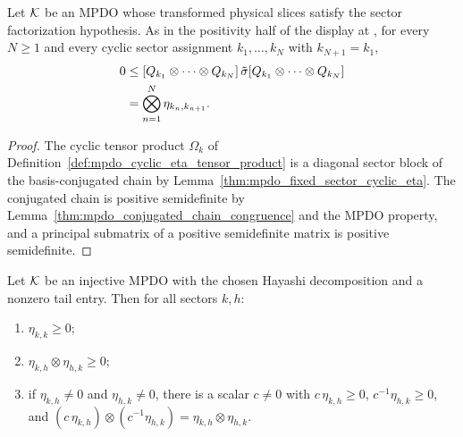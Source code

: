 \begin{lemma}%
    \label{thm:mpdo_cyclic_eta_posSemidef}
    \leanok
    Let ${\cal K}$ be an MPDO whose transformed physical slices satisfy the
    sector factorization hypothesis. As in the positivity half of the display at
    \cite[Appendix~C.2, lines~1446--1450]{Cirac2016MPDO_arXiv}, for every
    $N\ge1$ and every cyclic sector assignment $k_1,\ldots,k_N$ with
    $k_{N+1}=k_1$,
    \begin{align}
        0
         & \leq
        [Q_{k_1}\otimes\cdots\otimes Q_{k_N}]\,\tilde\sigma
        [Q_{k_1}\otimes\cdots\otimes Q_{k_N}]
        \notag                                      \\
         & =\bigotimes_{n=1}^{N}\eta_{k_n,k_{n+1}}.
        \notag
    \end{align}
\end{lemma}

\begin{proof}
    \leanok
    The cyclic tensor product $\Omega_k$ of
    Definition~\ref{def:mpdo_cyclic_eta_tensor_product} is a diagonal
    sector block of the basis-conjugated chain by
    Lemma~\ref{thm:mpdo_fixed_sector_cyclic_eta}. The conjugated chain is
    positive semidefinite by
    Lemma~\ref{thm:mpdo_conjugated_chain_congruence} and the MPDO
    property, and a principal submatrix of a positive semidefinite matrix
    is positive semidefinite.
\end{proof}

\begin{lemma}%
    \label{thm:mpdo_sector_eta_pair_posSemidef}
    \leanok
    Let ${\cal K}$ be an injective MPDO with the chosen Hayashi
    decomposition and a nonzero tail entry. Then for all sectors $k,h$:
    \begin{enumerate}
        \item $\eta_{k,k}\ge0$;
        \item $\eta_{k,h}\otimes\eta_{h,k}\ge0$;
        \item if $\eta_{k,h}\ne0$ and $\eta_{h,k}\ne0$, there is a scalar
              $c\ne0$ with $c\,\eta_{k,h}\ge0$, $c^{-1}\eta_{h,k}\ge0$, and
              $(c\,\eta_{k,h})\otimes(c^{-1}\eta_{h,k})=\eta_{k,h}\otimes
                  \eta_{h,k}$.
    \end{enumerate}
\end{lemma}

